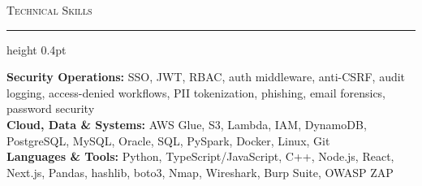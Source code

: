 \documentclass[letterpaper,11pt]{article}
\newcommand{\resumesection}[1]{%
  \par\vspace{2pt}%
  {\large\scshape #1}\par\vspace{2pt}%
  \hrule height 0.4pt\vspace{2pt}%
}
\begin{document}
\resumesection{Technical Skills}
\textbf{Security Operations:} SSO, JWT, RBAC, auth middleware, anti-CSRF, audit logging, access-denied workflows, PII tokenization, phishing, email forensics, password security\\
\textbf{Cloud, Data \& Systems:} AWS Glue, S3, Lambda, IAM, DynamoDB, PostgreSQL, MySQL, Oracle, SQL, PySpark, Docker, Linux, Git\\
\textbf{Languages \& Tools:} Python, TypeScript/JavaScript, C++, Node.js, React, Next.js, Pandas, hashlib, boto3, Nmap, Wireshark, Burp Suite, OWASP ZAP
\end{document}

